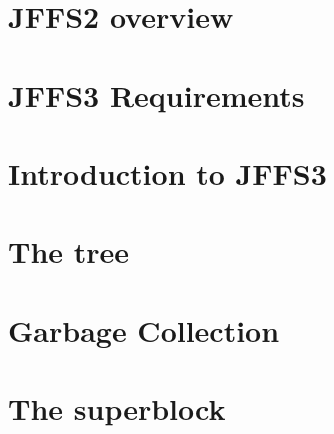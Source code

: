 \documentclass[12pt,a4paper,oneside,titlepage]{article}
\begin{document}
\section{JFFS2 overview}



%
%
\section{JFFS3 Requirements} \label{ref_SectionJFFS3Req}



%
%
\section{Introduction to JFFS3}


	
%
%
\section{The tree}



%
%
\section{Garbage Collection} \label{ref_SectionGC}



%
%
\section{The superblock} \label{ref_SectionSB}
\end{document}
